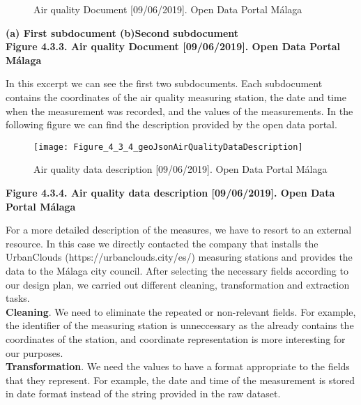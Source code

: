 \begin{figure}[ht]
    \centering
    \hfill
    \caption{Air quality Document [09/06/2019]. Open Data Portal Málaga}
\end{figure}
    
\begin{center}
    \bf{        (a) First subdocument (b)Second subdocument \\
    Figure 4.3.3. Air quality Document [09/06/2019]. Open Data Portal Málaga}
\end{center}
In this excerpt we can see the first two subdocuments.
Each subdocument contains the coordinates of the air quality measuring station, the date and time when the measurement was recorded, and the values of the measurements.
In the following figure we can find the description provided by the open data portal.\\
    
\begin{figure}[ht]
    \centering
    \texttt{[image: Figure\_4\_3\_4\_geoJsonAirQualityDataDescription]}
    \caption{Air quality data description [09/06/2019]. Open Data Portal Málaga}
\end{figure}
\begin{center}
    \bf{        
    Figure 4.3.4. Air quality data description [09/06/2019]. Open Data Portal Málaga}
\end{center}
For a more detailed description of the measures, we have to resort to an external resource.
In this case we directly contacted the company that installs the UrbanClouds (https://urbanclouds.city/es/) measuring stations and provides the data to the Málaga city council.
After selecting the necessary fields according to our design plan, we carried out different cleaning, transformation and extraction tasks. \\

\textbf{Cleaning}. We need to eliminate the repeated or non-relevant fields.
For example, the identifier of the measuring station is unneccessary as the  already contains the coordinates of the station, and coordinate representation is more interesting for our purposes. \\

\textbf{Transformation}. We need the values to have a format appropriate to the fields that they represent.
For example, the date and time of the measurement is stored in date format instead of the string provided in the raw dataset. \\

